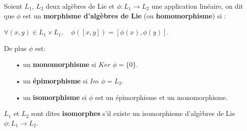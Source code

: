 \documentclass[a4paper,openany,12pt]{report}
\theoremstyle{break}
{\theorembodyfont{\upshape}
\newtheorem*{rmq}{Remarque :}
\newtheorem*{prv}{Preuve :}
\newtheorem*{ex}{Exemples :}
\newtheorem*{exe}{Exemple : }
\newtheorem*{nota}{Notation :}
\newtheorem*{dem}{D\'emonstration :}}
\begin{document}
\begin{df}
Soient $L_{1}$, $L_{2}$ deux algèbres de Lie et $\phi: L_{1} \rightarrow L_{2}$ une application linéaire, on dit que $\phi$ est un \textbf{morphisme d'algèbres de Lie} (ou \textbf{homomorphisme}) si :
\begin{center}
$ \forall(x, y) \in L_{1} \times L_{1}, \quad \phi([x, y])=[\phi(x), \phi(y)]$.
\end{center}
De plus $\phi$ est:
\begin{itemize}
\item[•] un \textbf{monomorphisme} si $Ker$ $\phi = \{ 0 \}$.
\item[•] un \textbf{épimorphisme} si $Im$ $\phi = L_{2}$.
\item[•] un \textbf{isomorphisme} si $\phi$ est un épimorphisme et un monomorphisme.
\end{itemize}
$L_{1}$ et $L_{2}$ sont dites \textbf{isomorphes} s'il existe un isomorphisme d'algèbres de Lie $\phi: L_{1} \rightarrow L_{2}$.  
\end{df}
\end{document}
